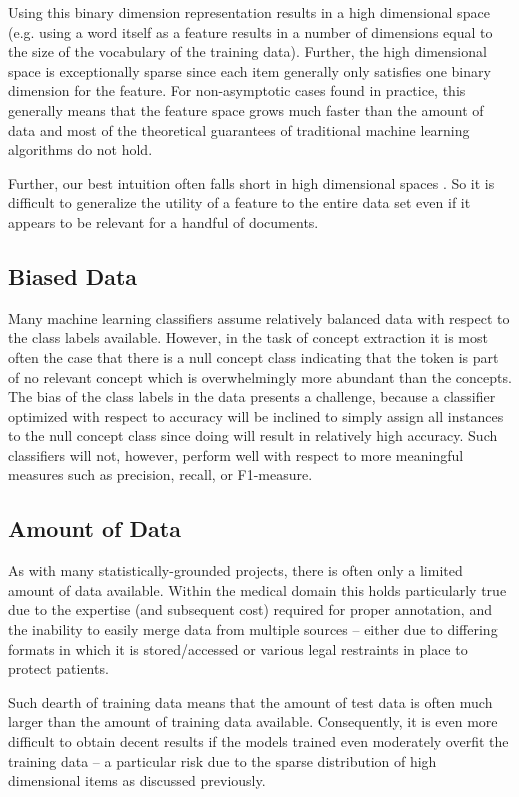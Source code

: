 \documentclass[preprint]{style}
\begin{document}
Using this binary dimension representation results in a high dimensional space (e.g. using a word itself as a feature results in a number of dimensions equal to the size of the vocabulary of the training data). Further, the high dimensional space is exceptionally sparse since each item generally only satisfies one binary dimension for the feature. For non-asymptotic cases found in practice, this generally means that the feature space grows much faster than the amount of data and most of the theoretical guarantees of traditional machine learning algorithms do not hold.

Further, our best intuition often falls short in high dimensional spaces \cite{dimensions}. So it is difficult to generalize the utility of a feature to the entire data set even if it appears to be relevant for a handful of documents.

\subsection{Biased Data}
Many machine learning classifiers assume relatively balanced data with respect to the class labels available. However, in the task of concept extraction it is most often the case that there is a null concept class indicating that the token is part of no relevant concept which is overwhelmingly more abundant than the concepts. The bias of the class labels in the data presents a challenge, because a classifier optimized with respect to accuracy will be inclined to simply assign all instances to the null concept class since doing will result in relatively high accuracy. Such classifiers will not, however, perform well with respect to more meaningful measures such as precision, recall, or F1-measure.


\subsection{Amount of Data}
As with many statistically-grounded projects, there is often only a limited amount of data available. Within the medical domain this holds particularly true due to the expertise (and subsequent cost) required for proper annotation, and the inability to easily merge data from multiple sources -- either due to differing formats in which it is stored/accessed or various legal restraints in place to protect patients.

Such dearth of training data means that the amount of test data is often much larger than the amount of training data available. Consequently, it is even more difficult to obtain decent results if the models trained even moderately overfit the training data -- a particular risk due to the sparse distribution of high dimensional items as discussed previously.
\end{document}
